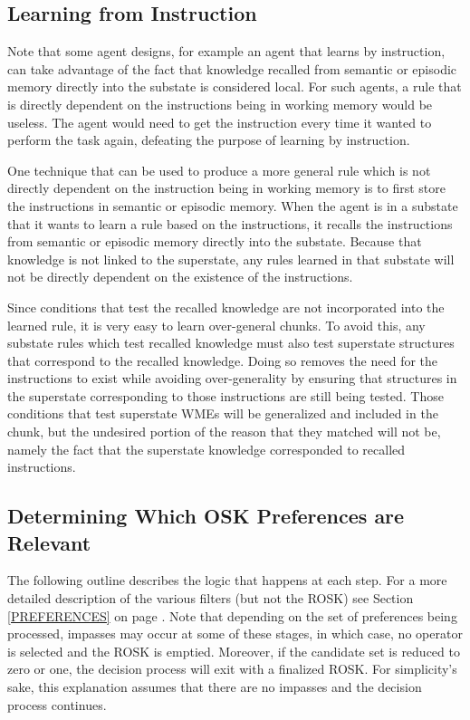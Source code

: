 \subsection{Learning from Instruction}
\label{CHUNKING-subtleties-instruction}

Note that some agent designs, for example an agent that learns by instruction, can take advantage of the fact that knowledge recalled from semantic or episodic memory directly into the substate is considered local.   For such agents, a rule that is directly dependent on the instructions being in working memory would be useless.  The agent would need to get the instruction every time it wanted to perform the task again, defeating the purpose of learning by instruction.

One technique that can be used to produce a more general rule which is not directly dependent on the instruction being in working memory is to first store the instructions in semantic or episodic memory.  When the agent is in a substate that it wants to learn a rule based on the instructions, it recalls the instructions from semantic or episodic memory directly into the substate.  Because that knowledge is not linked to the superstate, any rules learned in that substate will not be directly dependent on the existence of the instructions.

Since conditions that test the recalled knowledge are not incorporated into the learned rule, it is very easy to learn over-general chunks.  To avoid this, any substate rules which test recalled knowledge must also test superstate structures that correspond to the recalled knowledge.  Doing so removes the need for the instructions to exist while avoiding over-generality by ensuring that structures in the superstate corresponding to those instructions are still being tested.  Those conditions that test superstate WMEs will be generalized and included in the chunk, but the undesired portion of the reason that they matched will not be, namely the fact that the superstate knowledge corresponded to recalled instructions.

\subsection{Determining Which OSK Preferences are Relevant}
\label{CHUNKING-subtleties-relevant-osk}

The following outline describes the logic that happens at each step. For a more detailed description of the various filters (but not the ROSK) see Section \ref{PREFERENCES} on page \pageref{PREFERENCES}. Note that depending on the set of preferences being processed, impasses may occur at some of these stages, in which case, no operator is selected and the ROSK is emptied. Moreover, if the candidate set is reduced to zero or one, the decision process will exit with a finalized ROSK. For simplicity's sake, this explanation assumes that there are no impasses and the decision process continues.

